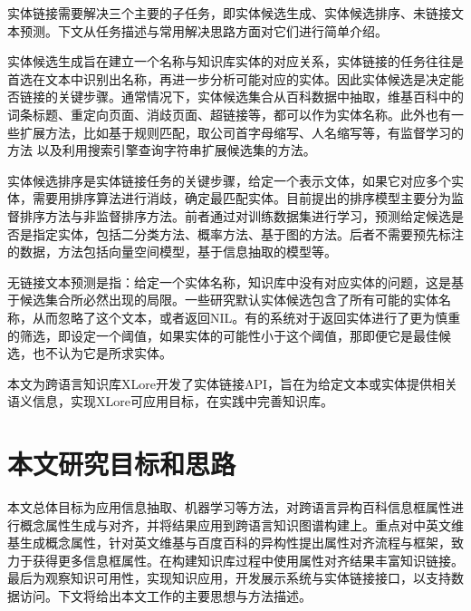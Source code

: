 实体链接需要解决三个主要的子任务，即实体候选生成、实体候选排序、未链接文本预测。下文从任务描述与常用解决思路方面对它们进行简单介绍。

{\heiti 实体候选生成}旨在建立一个名称与知识库实体的对应关系，实体链接的任务往往是首选在文本中识别出名称，再进一步分析可能对应的实体。因此实体候选是决定能否链接的关键步骤。通常情况下，实体候选集合从百科数据中抽取\cite{bunescu2006using,shen2012linden,shen2013linking}，维基百科中的词条标题、重定向页面、消歧页面、超链接等，都可以作为实体名称。此外也有一些扩展方法，比如基于规则匹配\cite{han2009nlpr_kbp,lehmann2010lcc}，取公司首字母缩写、人名缩写等，有监督学习的方法\cite{zhang2011entity} 以及利用搜索引擎查询字符串扩展候选集的方法\cite{dredze2010entity, monahan2011cross}。

{\heiti 实体候选排序}是实体链接任务的关键步骤，给定一个表示文体，如果它对应多个实体，需要用排序算法进行消歧，确定最匹配实体。目前提出的排序模型主要分为监督排序方法与非监督排序方法。前者通过对训练数据集进行学习，预测给定候选是否是指定实体，包括二分类方法\cite{zhang2010entity,lehmann2010lcc,monahan2011cross,chen2011collaborative}、概率方法\cite{han2011generative}、基于图的方法\cite{han2011collective}。后者不需要预先标注的数据，方法包括向量空间模型\cite{cucerzan2007large,han2009nlpr_kbp}，基于信息抽取的模型\cite{varma2009iiit,gottipati2011linking}等。

{\heiti 无链接文本预测}是指：给定一个实体名称，知识库中没有对应实体的问题，这是基于候选集合所必然出现的局限。一些研究默认实体候选包含了所有可能的实体名称，从而忽略了这个文本\cite{cucerzan2007large,kulkarni2009collective,shen2012liege}，或者返回NIL\cite{varma2009iiit}。有的系统对于返回实体进行了更为慎重的筛选，即设定一个阈值，如果实体的可能性小于这个阈值，那即便它是最佳候选，也不认为它是所求实体\cite{han2009nlpr_kbp,lehmann2010lcc,han2011generative}。

本文为跨语言知识库XLore开发了实体链接API，旨在为给定文本或实体提供相关语义信息，实现XLore可应用目标，在实践中完善知识库。

\section{本文研究目标和思路}
本文总体目标为应用信息抽取、机器学习等方法，对跨语言异构百科信息框属性进行概念属性生成与对齐，并将结果应用到跨语言知识图谱构建上。重点对中英文维基生成概念属性，针对英文维基与百度百科的异构性提出属性对齐流程与框架，致力于获得更多信息框属性。在构建知识库过程中使用属性对齐结果丰富知识链接。最后为观察知识可用性，实现知识应用，开发展示系统与实体链接接口，以支持数据访问。下文将给出本文工作的主要思想与方法描述。

